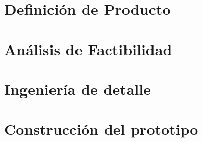 \documentclass[12pt]{article}
\begin{document}
  \section{Definición de Producto}  

    

  \newpage


  \section{Análisis de Factibilidad}  

    
  
  \newpage



  \section{Ingeniería de detalle}  

    

  \newpage


  \section{Construcción del prototipo}  

    

  \newpage

% 
\end{document}
